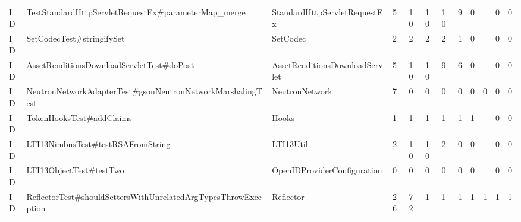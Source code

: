 \begin{table}[t]
\begin{tabular}{llllllllllll}
ID & TestStandardHttpServletRequestEx\#parameterMap\_merge & StandardHttpServletRequestEx & 5 & 10 & 10 & 10 & 9 & 0 &  & 0 & 0 \\
ID & SetCodecTest\#stringifySet & SetCodec & 2 & 2 & 2 & 2 & 1 & 0 &  & 0 & 0 \\
ID & AssetRenditionsDownloadServletTest\#doPost & AssetRenditionsDownloadServlet & 5 & 10 & 10 & 9 & 6 & 0 &  & 0 & 0 \\
ID & NeutronNetworkAdapterTest\#gsonNeutronNetworkMarshalingTest & NeutronNetwork & 7 & 0 & 0 & 0 & 0 & 0 & 0 & 0 & 0 \\
ID & TokenHooksTest\#addClaims & Hooks & 1 & 1 & 1 & 1 & 1 & 1 &  & 0 & 0 \\
ID & LTI13NimbusTest\#testRSAFromString & LTI13Util & 2 & 10 & 10 & 2 & 0 & 0 &  & 0 & 0 \\
ID & LTI13ObjectTest\#testTwo & OpenIDProviderConfiguration & 0 & 0 & 0 & 0 & 0 & 0 &  & 0 & 0 \\
ID & ReflectorTest\#shouldSettersWithUnrelatedArgTypesThrowException & Reflector & 26 & 72 & 1 & 1 & 1 & 1 & 1 & 1 & 1 \\
\bottomrule
\end{tabular}
\end{table}
